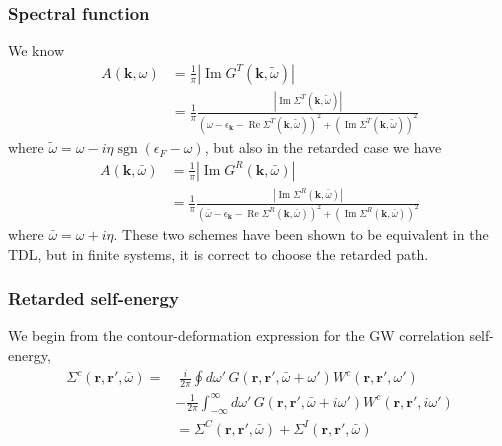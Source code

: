 \subsubsection{Spectral function}
We know
\begin{align}
A(\mathbf{k}, \omega)&=\frac{1}{\pi} |\operatorname{Im} G^T(\mathbf{k}, \tilde{\omega})|\\
&=\frac{1}{\pi} \frac{|\operatorname{Im} \Sigma^T(\mathbf{k}, \tilde{\omega})|}{\left(\omega-\epsilon_{\mathbf{k}}-\operatorname{Re} \Sigma^T(\mathbf{k}, \tilde{\omega})\right)^2+\left(\operatorname{Im} \Sigma^T(\mathbf{k}, \tilde{\omega})\right)^2}
\end{align}
where $\tilde{\omega} = \omega - i \eta\operatorname{sgn}\left(\epsilon_F - \omega\right)$, but also in the retarded case we have 
\begin{align}
A(\mathbf{k}, \bar{\omega})&=\frac{1}{\pi} |\operatorname{Im} G^R(\mathbf{k}, \bar{\omega})|\\
&=\frac{1}{\pi} 
\frac{|\operatorname{Im} \Sigma^R(\mathbf{k}, \bar{\omega})|}
{\left(\bar{\omega}-\epsilon_{\mathbf{k}}-\operatorname{Re} \Sigma^R(\mathbf{k}, \bar{\omega})\right)^2
+\left(\operatorname{Im} \Sigma^R(\mathbf{k}, \bar{\omega})\right)^2}
\end{align}
where $\bar{\omega} = \omega + i \eta$. These two schemes have been shown to be equivalent in the TDL, but in finite systems, it is correct to choose the retarded path.
\subsubsection{Retarded self-energy}
We begin from the contour-deformation expression for the GW correlation self-energy,
\begin{align}
\Sigma^c\left(\mathbf{r},\mathbf{r}',\bar{\omega}\right)
=&\;
\frac{i}{2\pi}
\oint d\omega'\,
G\left(\mathbf{r},\mathbf{r}',\bar{\omega}+\omega'\right)
W^c\left(\mathbf{r},\mathbf{r}',\omega'\right)
\nonumber \\
&-
\frac{1}{2\pi}
\int_{-\infty}^{\infty}
d\omega'\,
G\left(\mathbf{r},\mathbf{r}',\bar{\omega}+i\omega'\right)
W^c\left(\mathbf{r},\mathbf{r}',i\omega'\right) \\
&=
\Sigma^C\left(\mathbf{r},\mathbf{r}',\bar{\omega}\right)
+
\Sigma^I\left(\mathbf{r},\mathbf{r}',\bar{\omega}\right)
\end{align}
